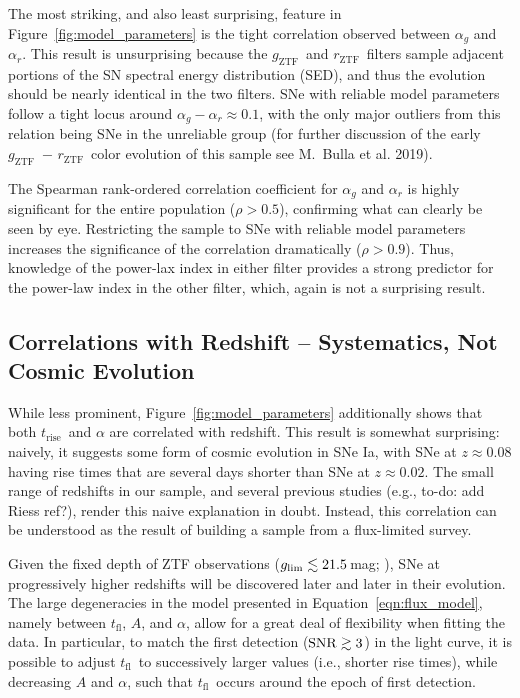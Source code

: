 \documentclass[twocolumn]{./aastex63}
\newcommand{\todo}[1]{{\color{magenta} to-do: {#1}}}
\newcommand{\rztf}{$r_\mathrm{ZTF}$}
\newcommand{\gztf}{$g_\mathrm{ZTF}$}
\newcommand{\tfl}{$t_\mathrm{fl}$}
\newcommand{\trise}{$t_\mathrm{rise}$}
\begin{document}
The most striking, and also least surprising, feature in
Figure~\ref{fig:model_parameters} is the tight correlation observed between
$\alpha_g$ and $\alpha_r$. This result is unsurprising because the \gztf\
and \rztf\ filters sample adjacent portions of the SN spectral energy
distribution (SED), and thus the evolution should be nearly identical in the
two filters. SNe with reliable model parameters follow a tight locus around
$\alpha_g - \alpha_r \approx 0.1$, with the only major outliers from this
relation being SNe in the unreliable group (for further discussion of the
early \gztf\ $-$ \rztf\ color evolution of this sample see M.~Bulla et al.
2019).

The Spearman rank-ordered correlation coefficient for $\alpha_g$
and $\alpha_r$ is highly significant for the entire population ($\rho >
0.5$), confirming what can clearly be seen by eye. Restricting the sample to
SNe with reliable model parameters increases the significance of the
correlation dramatically ($\rho > 0.9$). Thus, knowledge of the power-lax
index in either filter provides a strong predictor for the power-law index
in the other filter, which, again is not a surprising result.

\subsection{Correlations with Redshift -- Systematics, Not Cosmic Evolution}\label{sec:redshift_correlations}

While less prominent, Figure~\ref{fig:model_parameters} additionally shows
that both \trise\ and $\alpha$ are correlated with redshift. This result is
somewhat surprising: naively, it suggests some form of cosmic evolution in SNe
Ia, with SNe at $z \approx 0.08$ having rise times that are several days
shorter than SNe at $z \approx 0.02$. The small range of redshifts in our
sample, and several previous studies (e.g., \citealt{Conley06} \todo{add Riess ref?}),
render this naive explanation in doubt. Instead, this correlation can be
understood as the result of building a sample from a flux-limited survey.

Given the fixed depth of ZTF observations ($g_\mathrm{lim} \lesssim 21.5$\,mag;
\citealt{Masci19,Bellm19}), SNe at progressively higher redshifts will be
discovered later and later in their evolution. The large degeneracies in the
model presented in Equation~\ref{eqn:flux_model}, namely between \tfl, $A$,
and $\alpha$, allow for a great deal of flexibility when fitting the data. In
particular, to match the first detection ($\mathrm{SNR} \gtrsim 3$) in the light
curve, it is possible to adjust \tfl\ to successively larger values (i.e.,
shorter rise times), while decreasing $A$ and $\alpha$, such that \tfl\ occurs
around the epoch of first detection. 
\end{document}
